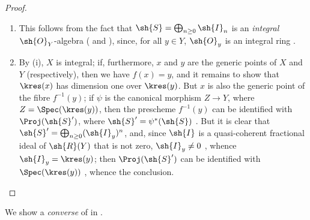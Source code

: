 \begin{proof}
\medskip\noindent
\begin{enumerate}
    \item[\rm{(i)}] This follows from the fact that $\sh{S} = \bigoplus_{n\geq0}\sh{I}_n$ is an \emph{integral} $\sh{O}_Y$-algebra ( and ), since, for all $y\in Y$, $\sh{O}_y$ is an integral ring .
    \item[\rm{(ii)}] By (i), $X$ is integral;
        if, furthermore, $x$ and $y$ are the generic points of $X$ and $Y$ (respectively), then we have $f(x) = y$, and it remains to show that $\kres(x)$ has dimension one over $\kres(y)$.
        But $x$ is also the generic point of the fibre $f^{-1}(y)$;
        if $\psi$ is the canonical morphism $Z\to Y$, where $Z=\Spec(\kres(y))$, then the prescheme $f^{-1}(y)$ can be identified with $\Proj(\sh{S}')$, where $\sh{S}' = \psi^*(\sh{S})$ .
        But it is clear that $\sh{S}' = \bigoplus_{n\geq0}(\sh{I}_y)^n$, and, since $\sh{I}$ is a quasi-coherent fractional ideal of $\sh{R}(Y)$ that is not zero, $\sh{I}_y \neq 0$ , whence $\sh{I}_y = \kres(y)$;
        then $\Proj(\sh{S}')$ can be identified with $\Spec(\kres(y))$ , whence the conclusion.
\end{enumerate}
\end{proof}

We show a \emph{converse} of  in .

